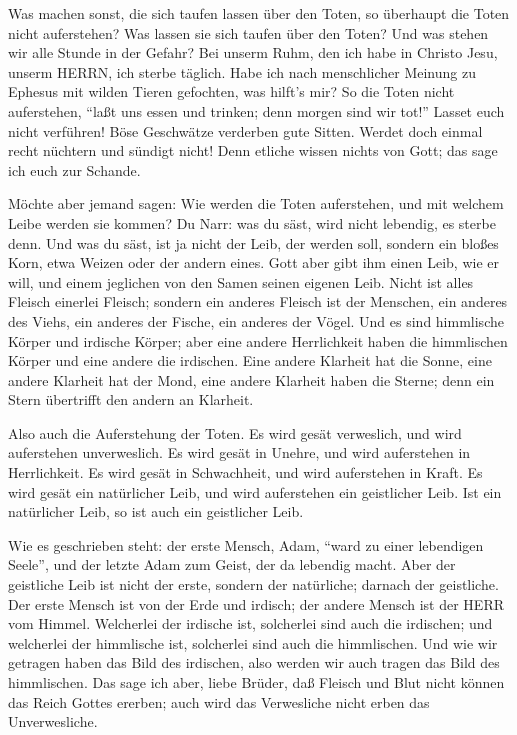  Was machen sonst, die sich taufen lassen über den Toten,
so überhaupt die Toten nicht auferstehen? Was lassen sie sich taufen
über den Toten?  Und was stehen wir alle Stunde in der
Gefahr?  Bei unserm Ruhm, den ich habe in Christo Jesu,
unserm HERRN, ich sterbe täglich.  Habe ich nach
menschlicher Meinung zu Ephesus mit wilden Tieren gefochten, was hilft's
mir? So die Toten nicht auferstehen, ``laßt uns essen und trinken; denn
morgen sind wir tot!''  Lasset euch nicht verführen! Böse
Geschwätze verderben gute Sitten.  Werdet doch einmal recht
nüchtern und sündigt nicht! Denn etliche wissen nichts von Gott; das
sage ich euch zur Schande.

 Möchte aber jemand sagen: Wie werden die Toten
auferstehen, und mit welchem Leibe werden sie kommen?  Du
Narr: was du säst, wird nicht lebendig, es sterbe denn. 
Und was du säst, ist ja nicht der Leib, der werden soll, sondern ein
bloßes Korn, etwa Weizen oder der andern eines.  Gott aber
gibt ihm einen Leib, wie er will, und einem jeglichen von den Samen
seinen eigenen Leib.  Nicht ist alles Fleisch einerlei
Fleisch; sondern ein anderes Fleisch ist der Menschen, ein anderes des
Viehs, ein anderes der Fische, ein anderes der Vögel.  Und
es sind himmlische Körper und irdische Körper; aber eine andere
Herrlichkeit haben die himmlischen Körper und eine andere die irdischen.
 Eine andere Klarheit hat die Sonne, eine andere Klarheit
hat der Mond, eine andere Klarheit haben die Sterne; denn ein Stern
übertrifft den andern an Klarheit.

 Also auch die Auferstehung der Toten. Es wird gesät
verweslich, und wird auferstehen unverweslich.  Es wird
gesät in Unehre, und wird auferstehen in Herrlichkeit. Es wird gesät in
Schwachheit, und wird auferstehen in Kraft.  Es wird gesät
ein natürlicher Leib, und wird auferstehen ein geistlicher Leib. Ist ein
natürlicher Leib, so ist auch ein geistlicher Leib.

 Wie es geschrieben steht: der erste Mensch, Adam, ``ward
zu einer lebendigen Seele'', und der letzte Adam zum Geist, der da
lebendig macht.  Aber der geistliche Leib ist nicht der
erste, sondern der natürliche; darnach der geistliche.  Der
erste Mensch ist von der Erde und irdisch; der andere Mensch ist der
HERR vom Himmel.  Welcherlei der irdische ist, solcherlei
sind auch die irdischen; und welcherlei der himmlische ist, solcherlei
sind auch die himmlischen.  Und wie wir getragen haben das
Bild des irdischen, also werden wir auch tragen das Bild des
himmlischen.  Das sage ich aber, liebe Brüder, daß Fleisch
und Blut nicht können das Reich Gottes ererben; auch wird das
Verwesliche nicht erben das Unverwesliche.

